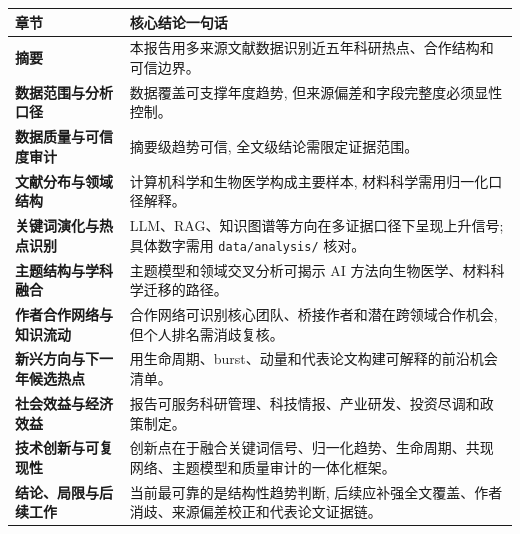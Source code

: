 \begin{center}
\begin{tabularx}{\textwidth}{>{\bfseries}p{36mm}>{\raggedright\arraybackslash}X}
\toprule
章节 & 核心结论一句话 \\
\midrule
摘要 & 本报告用多来源文献数据识别近五年科研热点、合作结构和可信边界。 \\
数据范围与分析口径 & 数据覆盖可支撑年度趋势, 但来源偏差和字段完整度必须显性控制。 \\
数据质量与可信度审计 & 摘要级趋势可信, 全文级结论需限定证据范围。 \\
文献分布与领域结构 & 计算机科学和生物医学构成主要样本, 材料科学需用归一化口径解释。 \\
关键词演化与热点识别 & LLM、RAG、知识图谱等方向在多证据口径下呈现上升信号; 具体数字需用 \texttt{data/analysis/} 核对。 \\
主题结构与学科融合 & 主题模型和领域交叉分析可揭示 AI 方法向生物医学、材料科学迁移的路径。 \\
作者合作网络与知识流动 & 合作网络可识别核心团队、桥接作者和潜在跨领域合作机会, 但个人排名需消歧复核。 \\
新兴方向与下一年候选热点 & 用生命周期、burst、动量和代表论文构建可解释的前沿机会清单。 \\
社会效益与经济效益 & 报告可服务科研管理、科技情报、产业研发、投资尽调和政策制定。 \\
技术创新与可复现性 & 创新点在于融合关键词信号、归一化趋势、生命周期、共现网络、主题模型和质量审计的一体化框架。 \\
结论、局限与后续工作 & 当前最可靠的是结构性趋势判断, 后续应补强全文覆盖、作者消歧、来源偏差校正和代表论文证据链。 \\
\bottomrule
\end{tabularx}
\end{center}

\clearpage
